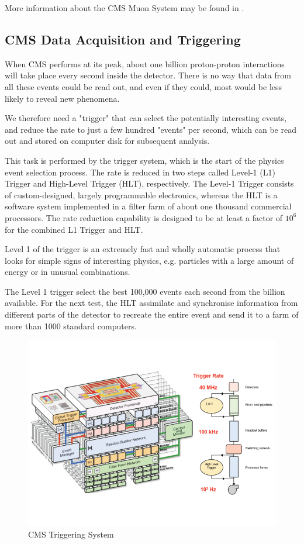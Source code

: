 More information about the CMS Muon System may be found in \cite{MUON}.

\subsection{CMS Data Acquisition and Triggering}\label{triggerbase}

When CMS performs at its peak, about one billion proton-proton interactions will take place every second inside the detector. There is no way that data from all these events could be read out, and even if they could, most would be less likely to reveal new phenomena.

We therefore need a "trigger" \cite{TRIGGER1,TRIGGER2} that can select the potentially interesting events, and reduce the rate to just a few hundred "events" per second, which can be read out and stored on computer disk for subsequent analysis.

This task is performed by the trigger system, which is the start of the physics event selection process. The rate is reduced in two steps called Level-1 (L1) Trigger and High-Level Trigger (HLT), respectively. The Level-1 Trigger consists of custom-designed, largely programmable electronics, whereas the HLT is a software
system implemented in a filter farm of about one thousand commercial processors. The rate reduction capability is designed to be at least a factor of $10^{6}$ for the combined L1 Trigger and HLT. 

Level 1 of the trigger is an extremely fast and wholly automatic process that looks for simple signs of interesting physics, e.g. particles with a large amount of energy or in unusual combinations.

The Level 1 trigger select the best 100,000 events each second from the billion available. For the next test, the HLT assimilate and synchronise information from different parts of the detector to recreate the entire event and send it to a farm of more than 1000 standard computers.

\begin{figure}[H]
  \centering
\includegraphics[width=14cm]{CMS_chapter_plots/TRIGGER}
  \caption{CMS Triggering System \label{fig:TRIGGER}}
\end{figure}

